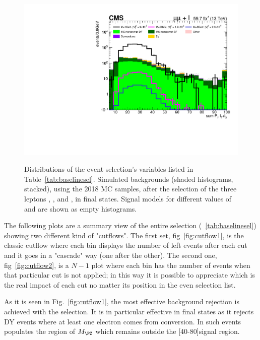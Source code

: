 \begin{figure}[h]
{  \includegraphics[clip,trim=0.9cm 0 0.7cm 0,width=.25\textwidth]{Figures/c6/selection/18/mu_sum_Pt_L2L3__0.pdf}}
  \caption{Distributions of the event selection's variables listed in
    Table~\ref{tab:baselinesel}. Simulated backgrounds (shaded histograms, stacked),
    using the 2018 MC samples, 
    after the selection of the three leptons \lone, \ltwo, and \lthree,
    in \mmx final states.
    Signal models for different values of \mhnl and \mixpar are shown
    as empty histograms.}
  \label{fig:selection_muons}
\end{figure}

The following plots are a summary view of the entire selection
(~\ref{tab:baselinesel}) showing two different kind of "cutflows". The
first set, fig~\ref{fig:cutflow1}, is the classic cutflow where each
bin displays the number of left events after each cut and it goes in a
"cascade" way (one after the other). The second one,
fig~\ref{fig:cutflow2}, is a $N-1$ plot where each bin has the number
of events when that particular cut is not applied; in this way it is
possible to appreciate which is the real impact of each cut no matter
its position in the even selection list. 

As it is seen in Fig.~\ref{fig:cutflow1}, the most effective background rejection is achieved with the \mthreel selection. It is in particular effective in \eex final states as it rejects DY events where at least one electron comes from conversion. In such events \mthreel populates the region of $M_{\PZ}$ which remains outside the [40-80]\GeV signal region.

